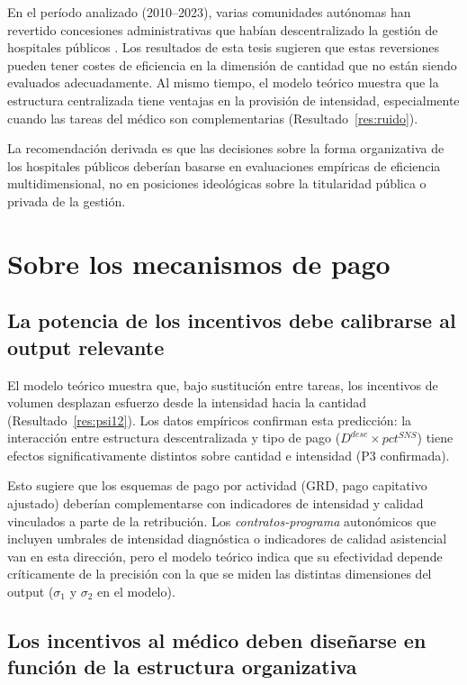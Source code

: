 \documentclass[12pt, a4paper, twoside, openright]{book}
\theoremstyle{plain}
\theoremstyle{definition}
\theoremstyle{remark}
\begin{document}
En el período analizado (2010--2023), varias comunidades autónomas han revertido concesiones administrativas que habían descentralizado la gestión de hospitales públicos \citep{repullo2008}. Los resultados de esta tesis sugieren que estas reversiones pueden tener costes de eficiencia en la dimensión de cantidad que no están siendo evaluados adecuadamente. Al mismo tiempo, el modelo teórico muestra que la estructura centralizada tiene ventajas en la provisión de intensidad, especialmente cuando las tareas del médico son complementarias (Resultado~\ref{res:ruido}).

La recomendación derivada es que las decisiones sobre la forma organizativa de los hospitales públicos deberían basarse en evaluaciones empíricas de eficiencia multidimensional, no en posiciones ideológicas sobre la titularidad pública o privada de la gestión.

\section{Sobre los mecanismos de pago}

\subsection{La potencia de los incentivos debe calibrarse al output relevante}

El modelo teórico muestra que, bajo sustitución entre tareas, los incentivos de volumen desplazan esfuerzo desde la intensidad hacia la cantidad (Resultado~\ref{res:psi12}). Los datos empíricos confirman esta predicción: la interacción entre estructura descentralizada y tipo de pago ($D^{desc}\times pct^{SNS}$) tiene efectos significativamente distintos sobre cantidad e intensidad (P3 confirmada).

Esto sugiere que los esquemas de pago por actividad (GRD, pago capitativo ajustado) deberían complementarse con indicadores de intensidad y calidad vinculados a parte de la retribución. Los \textit{contratos-programa} autonómicos que incluyen umbrales de intensidad diagnóstica o indicadores de calidad asistencial van en esta dirección, pero el modelo teórico indica que su efectividad depende críticamente de la precisión con la que se miden las distintas dimensiones del output ($\sigma_1$ y $\sigma_2$ en el modelo).

\subsection{Los incentivos al médico deben diseñarse en función de la estructura organizativa}
\end{document}
